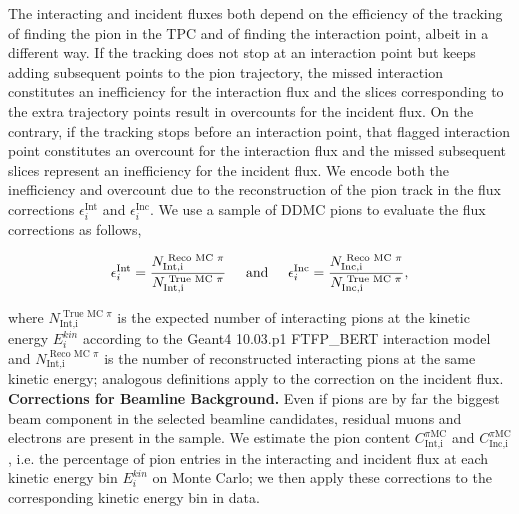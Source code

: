 \documentclass[aps,prl,twocolumn,showpacs,superscriptaddress,groupedaddress]{revtex4}  %
\begin{document}
The interacting and incident fluxes both depend on the efficiency of the tracking of finding the pion in the TPC and of finding the interaction point, albeit in a different way. If the tracking does not stop at an interaction point but keeps adding subsequent points to the pion trajectory, the missed interaction constitutes an inefficiency for the interaction flux and the slices corresponding to the extra trajectory points result in overcounts for the incident flux. On the contrary, if the tracking stops before an interaction point,  that flagged interaction point constitutes an overcount for the interaction flux and the missed subsequent slices represent an inefficiency for the incident flux. We encode both the inefficiency and overcount due to the reconstruction of the pion track in the flux corrections $\epsilon^{\text{Int}}_i$ and $\epsilon^{\text{Inc}}_i$. We use a sample of DDMC pions to evaluate the flux corrections as follows,

\begin{equation}
 \epsilon^{\text{Int}}_i  =  \frac{N^{\text{ Reco MC $\pi$}}_{\text{Int,i}}}{ N^{\text{ True MC  $\pi$}}_{\text{Int,i}}  } \hspace{0.5cm}\text{and}\hspace{0.5cm}  \epsilon^{\text{Inc}}_i  =  \frac{N^{\text{ Reco MC $\pi$}}_{\text{Inc,i}}}{ N^{\text{ True MC  $\pi$}}_{\text{Inc,i}}  },
\end{equation}

where $N^{\text{ True MC  $\pi$}}_{\text{Int,i}}$ is the expected number of interacting pions at the kinetic energy $E^{kin}_i$ according to the Geant4 10.03.p1 FTFP\_BERT interaction model and  $N^{\text{ Reco MC $\pi$}}_{\text{Int,i}}$ is the number of reconstructed interacting pions at the same kinetic energy; analogous definitions apply to the correction on the incident flux. \\




\textbf{Corrections for Beamline Background.}
Even if pions are by far the biggest beam component in the selected beamline candidates, residual muons and electrons are present in the sample. We estimate %
the pion content $C^{\pi \text{MC}}_{\text{Int,i}}$ and  $C^{\pi \text{MC}}_{\text{Inc,i}}$, i.e. the percentage of pion entries in the interacting and incident flux at each kinetic energy bin $E^{kin}_i$ on Monte Carlo; we then apply these corrections to the corresponding kinetic energy bin in data.  
\end{document}
